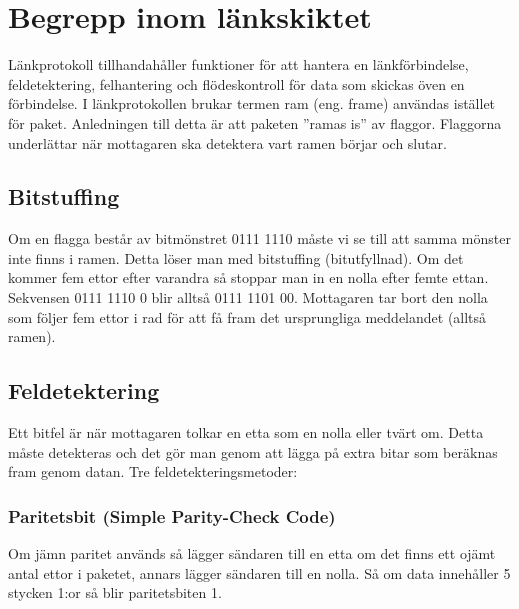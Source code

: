 \documentclass[11pt]{article}
\begin{document}
\section{Begrepp inom länkskiktet}
Länkprotokoll tillhandahåller funktioner för att hantera en länkförbindelse, feldetektering, felhantering och flödeskontroll för data som skickas öven en förbindelse. I länkprotokollen brukar termen ram (eng. frame) användas istället för paket. Anledningen till detta är att paketen ''ramas is'' av flaggor. Flaggorna underlättar när mottagaren ska detektera vart ramen börjar och slutar. 
\subsection{Bitstuffing}
Om en flagga består av bitmönstret 0111 1110 måste vi se till att samma mönster inte finns i ramen. Detta löser man med bitstuffing (bitutfyllnad). Om det kommer fem ettor efter varandra så stoppar man in en nolla efter femte ettan. Sekvensen 0111 1110 0 blir alltså 0111 1101 00. Mottagaren tar bort den nolla som följer fem ettor i rad för att få fram det ursprungliga meddelandet (alltså ramen).
\subsection{Feldetektering}
Ett bitfel är när mottagaren tolkar en etta som en nolla eller tvärt om. Detta måste detekteras och det gör man genom att lägga på extra bitar som beräknas fram genom datan. Tre feldetekteringsmetoder: 
\subsubsection*{Paritetsbit (Simple Parity-Check Code)}
Om jämn paritet används så lägger sändaren till en etta om det finns ett ojämt antal ettor i paketet, annars lägger sändaren till en nolla. Så om data innehåller 5 stycken 1:or så blir paritetsbiten 1.
\end{document}
